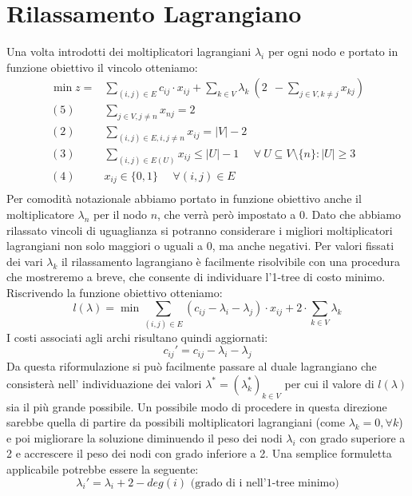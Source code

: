 \documentclass[
    article,            %
    12pt,                %
    oneside,            %
    a4paper,            %
    english,            %
    italian,                %
    sumario=tradicional,
]{abntex2}
\begin{document}
    \section{Rilassamento Lagrangiano}\label{sec:rilassamento-lagrangiano}
    Una volta introdotti dei moltiplicatori lagrangiani $\lambda_i$ per ogni nodo e portato in funzione obiettivo il vincolo otteniamo:
    \begin{equation*}
        \begin{split}
            \min z = & \sum_{(i,j) \in E} c_{ij} \cdot x_{ij} + \sum_{k\in V} \lambda_k \:(2 \:\:- \sum_{j\in V, k\neq j} x_{kj})\\
            (5)\:\:\:\:\:\: & \sum_{j \in V, j \neq n} x_{nj} = 2 \\
            (2) \:\:\:\:\:\: & \sum_{(i,j)\in E, i, j \neq n} x_{ij} = |V|-2 \\
            (3) \:\:\:\:\:\: & \sum_{(i,j) \in E(U)} x_{ij} \leq |U| - 1 \:\:\:\:\:\: \forall\: U \subseteq V\setminus\{n\} : |U| \geq 3 \\
            (4) \:\:\:\:\:\: & x_{ij} \in \{0,1\} \:\:\:\:\:\: \forall (i,j) \in E\\
        \end{split}
    \end{equation*}
    Per comodità notazionale abbiamo portato in funzione obiettivo anche il moltiplicatore $\lambda_n$ per il nodo $n$, che verrà però impostato a 0.
    Dato che abbiamo rilassato vincoli di uguaglianza si potranno considerare i migliori moltiplicatori lagrangiani non solo maggiori o uguali a 0, ma anche negativi.
    Per valori fissati dei vari $\lambda_k$ il rilassamento lagrangiano è facilmente risolvibile con una procedura che mostreremo a breve, che consente di individuare l'1-tree di costo minimo.
    \newline
    Riscrivendo la funzione obiettivo otteniamo:
    \begin{equation*}
        l(\lambda) = \min \sum_{(i,j)\in E} ( c_{ij} - \lambda_i - \lambda_j) \cdot x_{ij} + 2 \cdot \sum_{k \in V} \lambda_k
    \end{equation*}
    I costi associati agli archi risultano quindi aggiornati:
    \begin{equation*}
        c_{ij}' = c_{ij} - \lambda_i - \lambda_j
    \end{equation*}
    Da questa riformulazione si può facilmente passare al duale lagrangiano che consisterà nell' individuazione dei valori $\lambda^* = (\lambda_k^*)_{k\in V}$ per cui il valore di $l(\lambda)$ sia il più grande possibile.
    Un possibile modo di procedere in questa direzione sarebbe quella di partire da possibili moltiplicatori lagrangiani (come $\lambda_k = 0, \forall k$) e poi migliorare la soluzione diminuendo il peso dei nodi $\lambda_i$ con grado superiore a 2 e accrescere il peso dei nodi con grado inferiore a 2.
    Una semplice formuletta applicabile potrebbe essere la seguente:
    \begin{equation*}
        \lambda_i' = \lambda_i + 2 - deg(i) \text{ (grado di i nell'1-tree minimo)}
    \end{equation*}
\end{document}
